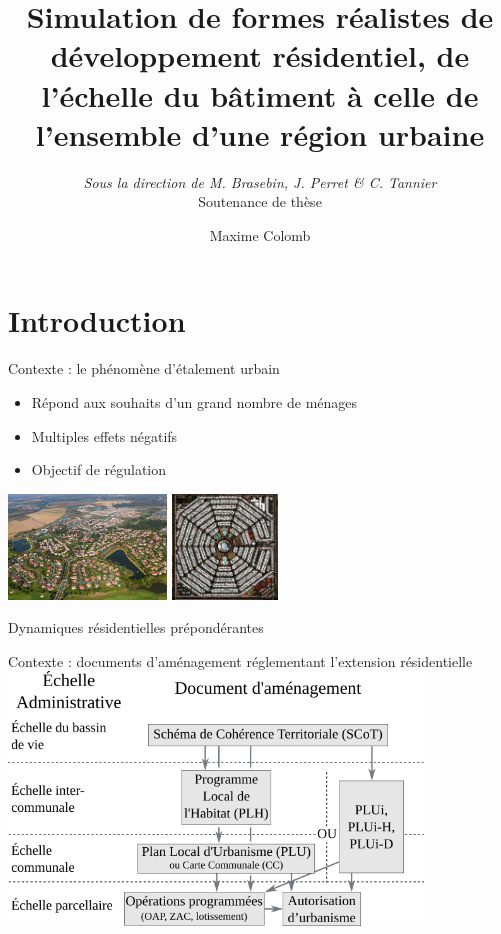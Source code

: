 \documentclass[xcolor=table]{beamer}
\title{Simulation de formes réalistes de développement résidentiel, de l'échelle du bâtiment à celle de l'ensemble d'une région urbaine}
\author{Maxime Colomb}
\subtitle{\textit{Sous la direction de M. Brasebin, J. Perret \& C. Tannier}
	\\Soutenance de thèse}
\begin{document}
\maketitle
\section{Introduction}
\begin{frame}{Contexte : le phénomène d'étalement urbain}
	\begin{block}{}
		\begin{itemize}
			\item Répond aux souhaits d'un grand nombre de ménages
			\item Multiples effets négatifs
			\item Objectif de régulation
		\end{itemize}
		\includegraphics[height=2.8cm]{Images/consome.jpg}
		\includegraphics[height=2.8cm]{Images/sto.jpeg}
	\end{block}
	\begin{block}{}
		Dynamiques résidentielles prépondérantes %
	\end{block}
\end{frame}

\begin{frame}{Contexte : documents d'aménagement réglementant l'extension résidentielle} 
	\includegraphics[width=11cm]{Images/planification-globale-Prez.png}
\end{frame}
\end{document}
